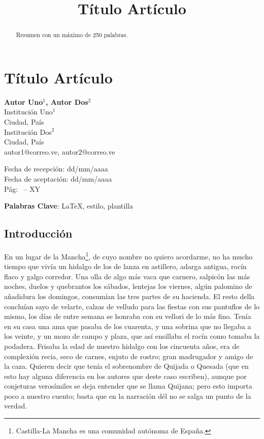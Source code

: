 %
%
\newpage
\title{Título Artículo}
\section{Título Artículo}

\begin{center}
\textbf{Autor Uno$^1$, Autor Dos$^2$} \\
Institución Uno$^1$ \\Ciudad, País\\
Institución Dos$^2$\\Ciudad, País\\
autor1@correo.ve, autor2@correo.ve
\end{center}

\begin{flushright}
Fecha de recepción: dd/mm/aaaa\\
Fecha de aceptación: dd/mm/aaaa\\
Pág: \thepage \ -- XY
\end{flushright}

\begin{abstract}
Resumen con un máximo de 250 palabras.
\end{abstract}

\textbf{Palabras Clave}: \LaTeX, estilo, plantilla

\subsection{Introducción}
En un lugar de la Mancha\footnote{Castilla-La Mancha es una comunidad autónoma de España.}, de cuyo nombre no quiero acordarme, no ha mucho tiempo que vivía un hidalgo de los de lanza en astillero, adarga antigua, rocín flaco y galgo corredor. Una olla de algo más vaca que carnero, salpicón las más noches, duelos y quebrantos los sábados, lentejas los viernes, algún palomino de añadidura los domingos, consumían las tres partes de su hacienda. El resto della concluían sayo de velarte, calzas de velludo para las fiestas con sus pantuflos de lo mismo, los días de entre semana se honraba con su vellori de lo más fino. Tenía en su casa una ama que pasaba de los cuarenta, y una sobrina que no llegaba a los veinte, y un mozo de campo y plaza, que así ensillaba el rocín como tomaba la podadera. Frisaba la edad de nuestro hidalgo con los cincuenta años, era de complexión recia, seco de carnes, enjuto de rostro; gran madrugador y amigo de la caza. Quieren decir que tenía el sobrenombre de Quijada o Quesada (que en esto hay alguna diferencia en los autores que deste caso escriben), aunque por conjeturas verosímiles se deja entender que se llama Quijana; pero esto importa poco a nuestro cuento; basta que en la narración dél no se salga un punto de la verdad. 

